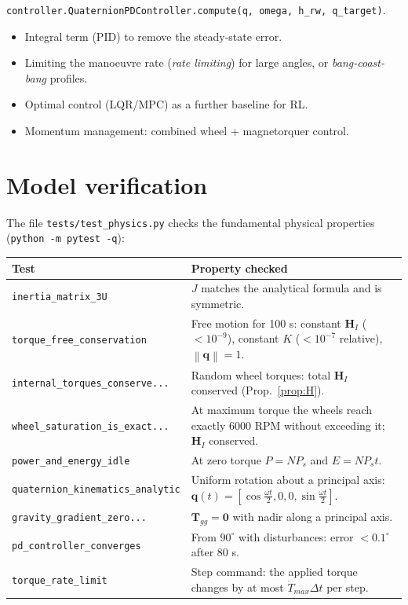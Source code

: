 \documentclass[11pt,a4paper]{article}
\newcommand{\vect}[1]{\bm{#1}}
\newcommand{\q}{\vect{q}}
\newcommand{\T}{\vect{T}}
\newcommand{\norm}[1]{\left\lVert #1 \right\rVert}
\newcommand{\code}[1]{\texttt{#1}}
\begin{document}
\begin{incode}
\code{controller.QuaternionPDController.compute(q, omega, h\_rw, q\_target)}.
\end{incode}

\begin{improvement}
\begin{itemize}[nosep]
  \item Integral term (PID) to remove the steady-state error.
  \item Limiting the manoeuvre rate (\emph{rate limiting}) for
        large angles, or \emph{bang-coast-bang} profiles.
  \item Optimal control (LQR/MPC) as a further baseline for RL.
  \item Momentum management: combined wheel + magnetorquer control.
\end{itemize}
\end{improvement}

\section{Model verification}

The file \code{tests/test\_physics.py} checks the fundamental physical properties
(\code{python -m pytest -q}):
\begin{center}
\begin{tabular}{p{5.2cm}p{9cm}}
\toprule
Test & Property checked\\
\midrule
\code{inertia\_matrix\_3U} & $J$ matches the analytical formula and is symmetric.\\
\code{torque\_free\_conservation} & Free motion for 100 s: constant $\vect H_I$ ($<10^{-9}$), constant $K$ ($<10^{-7}$ relative), $\norm{\q}=1$.\\
\code{internal\_torques\_conserve...} & Random wheel torques: total $\vect H_I$ conserved (Prop.~\ref{prop:H}).\\
\code{wheel\_saturation\_is\_exact...} & At maximum torque the wheels reach exactly 6000 RPM without exceeding it; $\vect H_I$ conserved.\\
\code{power\_and\_energy\_idle} & At zero torque $P=N P_s$ and $E = N P_s t$.\\
\code{quaternion\_kinematics\_analytic} & Uniform rotation about a principal axis: $\q(t) = [\cos\frac{\omega t}{2},0,0,\sin\frac{\omega t}{2}]$.\\
\code{gravity\_gradient\_zero...} & $\T_{gg}=\vect 0$ with nadir along a principal axis.\\
\code{pd\_controller\_converges} & From $90^\circ$ with disturbances: error $<0.1^\circ$ after 80 s.\\
\code{torque\_rate\_limit} & Step command: the applied torque changes by at most $\dot T_{max}\Delta t$ per step.\\
\bottomrule
\end{tabular}
\end{center}
\end{document}
